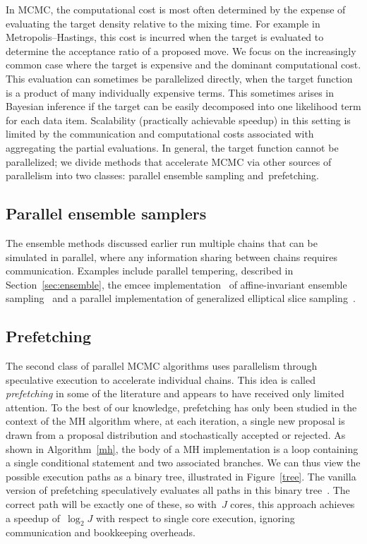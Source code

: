 \documentclass[angelino.tex]{subfiles}
\begin{document}
In MCMC, the computational cost is most often determined by the expense of
evaluating the target density relative to the mixing time.
For example in Metropolis--Hastings, this cost is incurred when the target is 
evaluated to determine the acceptance ratio of a proposed move.
We focus on the increasingly common case where the target is expensive and the 
dominant computational cost.
This evaluation can sometimes be parallelized directly,
\eg when the target function is a product of many individually expensive terms.
This sometimes arises in Bayesian inference if the target can be easily
decomposed into one likelihood term for each data item.
Scalability (\ie practically achievable speedup) in this setting is limited by
the communication and computational costs associated with aggregating
the partial evaluations.
In general, the target function cannot be parallelized;
we divide methods that accelerate MCMC via other sources of parallelism into
two classes: parallel ensemble sampling and~prefetching.

\subsection{Parallel ensemble samplers}

The ensemble methods discussed earlier run multiple chains that can be simulated
in parallel, where any information sharing between chains requires communication.
Examples include parallel tempering, described in Section~\ref{sec:ensemble},
the emcee implementation~\citep{goodman-2012-emcee}
of affine-invariant ensemble sampling~\citep{goodman-2010-ensemble}
and a parallel implementation of
generalized elliptical slice sampling~\citep{nishihara-2014-gess}.

\subsection{Prefetching}
\label{sec:mcmc-prefetching}

The second class of parallel MCMC algorithms uses parallelism through
speculative execution to accelerate individual chains.
This idea is called \emph{prefetching} in some of the literature and appears to
have received only limited attention.
To the best of our knowledge, prefetching has only been studied in the context
of the MH algorithm where, at each iteration, a single new proposal is drawn
from a proposal distribution and stochastically accepted or rejected.
As shown in Algorithm~\ref{mh}, the body of a MH implementation is a
loop containing a single conditional statement and two associated branches.
We can thus view the possible execution paths as a binary tree,
illustrated in Figure~\ref{tree}.
The vanilla version of prefetching speculatively evaluates all paths in this
binary tree~\citep{brockwell-2006-prefetching}.
The correct path will be exactly one of these, so with~$J$ cores, this approach 
achieves a speedup of~$\log_2 J$ with respect to single core execution,
ignoring communication and bookkeeping overheads.
\end{document}
